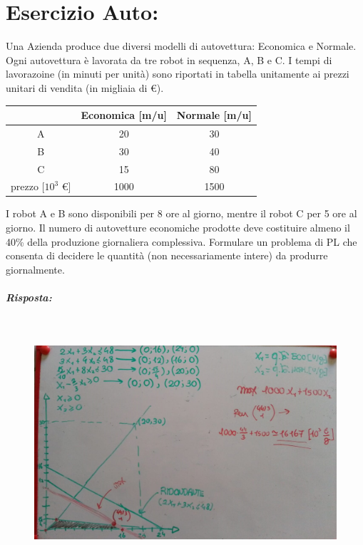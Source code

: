 \section{Esercizio Auto:} Una Azienda produce due diversi modelli di autovettura: Economica e Normale. Ogni autovettura è lavorata da tre robot in sequenza, A, B e C. I tempi di lavorazoine (in minuti per unità) sono riportati in tabella unitamente ai prezzi unitari di vendita (in migliaia di \euro).
\begin{table}[h!]
    \centering
    \begin{tabular}{|c|c|c|}
    \hline
     & Economica [m/u] & Normale [m/u]\\
    \hline
    \hline
    A & 20 & 30\\
    \hline
    B & 30 & 40\\
    \hline
    C & 15 & 80\\
    \hline
    prezzo [$10^3$ \euro] & 1000 & 1500\\
    \hline
    \end{tabular}
\end{table}
I robot A e B sono disponibili per 8 ore al giorno, mentre il robot C per 5 ore al giorno. Il numero di autovetture economiche prodotte deve costituire almeno il 40\% della produzione giornaliera complessiva. Formulare un problema di PL che consenta di decidere le quantità (non necessariamente intere) da produrre giornalmente.

\subparagraph{Risposta:}

\

\begin{figure}[h!]
    \centering
    \includegraphics[scale=0.2]{esercizioauto.jpeg}
\end{figure}




